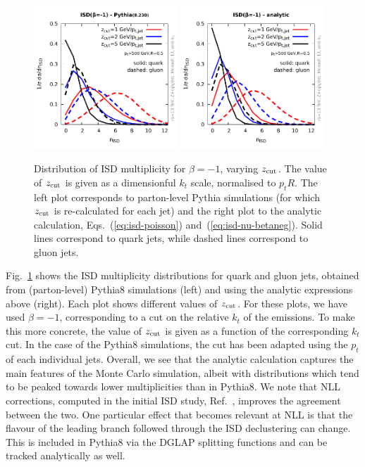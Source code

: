 \begin{figure}
  \includegraphics[width=0.48\textwidth]{figures/isd-distribs-pythia.pdf}%
  \hfill%
  \includegraphics[width=0.48\textwidth]{figures/isd-distribs-analytic.pdf}%
  \caption{Distribution of ISD multiplicity for $\beta=-1$, varying
    $z_{\text{cut}}$. The value of $z_{\text{cut}}$ is given as a dimensionful $k_t$
    scale, normalised to $p_tR$. The left plot
    corresponds to parton-level Pythia simulations (for which $z_{\text{cut}}$
    is re-calculated for each jet) and the right plot
    to the analytic calculation, Eqs.~(\ref{eq:isd-poisson})
    and~(\ref{eq:isd-nu-betaneg}). Solid lines correspond to quark
    jets, while dashed lines correspond to gluon jets.}\label{fig:isd-distrib-v-ktcut}
\end{figure}  

Fig.~\ref{fig:isd-distrib-v-ktcut} shows the ISD multiplicity
distributions for quark and gluon jets, obtained from (parton-level)
Pythia8 simulations (left) and using the analytic expressions above
(right). Each plot shows different values of $z_{\text{cut}}$.
%
For these plots, we have used $\beta=-1$, corresponding to a cut on
the relative $k_t$ of the emissions.
%
To make this more concrete, the value of $z_{\text{cut}}$ is given as a
function of the corresponding $k_t$ cut. In the case of the Pythia8
simulations, the cut has been adapted using the $p_t$ of each
individual jets.
% 
Overall, we see that the analytic calculation captures the main
features of the Monte Carlo simulation, albeit with distributions
which tend to be peaked towards lower multiplicities than in Pythia8.
%
We note that NLL corrections, computed in the initial ISD study,
Ref.~\cite{Frye:2017yrw}, improves the agreement between the
two.
%
One particular effect that becomes relevant at NLL is that the flavour
of the leading branch followed through the ISD declustering can
change. This is included in Pythia8 via the DGLAP splitting functions
and can be tracked analytically as well.


